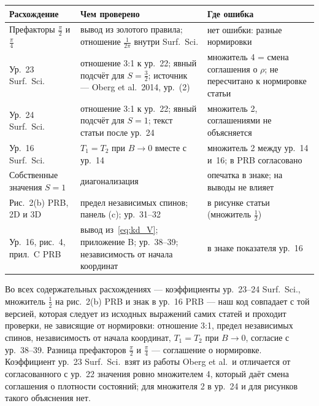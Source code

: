 \begin{center}\small
\begin{tabular}{p{3.6cm}p{5.6cm}p{4.8cm}}
\toprule
Расхождение & Чем проверено & Где ошибка \\
\midrule
Префакторы $\tfrac\pi2$ и $\tfrac\pi4$ & вывод из золотого правила; отношение
$\tfrac1{2\pi}$ внутри Surf.\ Sci. & нет ошибки: разные нормировки \\
Ур.~23 Surf.\ Sci. & отношение 3:1 к ур.~22; явный подсчёт для $S=\tfrac32$;
источник --- Oberg et al.\ 2014, ур.~(2) & множитель 4 = смена соглашения о $\rho$;
не пересчитано к нормировке статьи \\
Ур.~24 Surf.\ Sci. & отношение 3:1 к ур.~22; явный подсчёт для $S=1$; текст
статьи после ур.~24 & множитель 2, соглашениями не объясняется \\
Ур.~16 Surf.\ Sci. & $T_1=T_2$ при $B\to0$ вместе с ур.~14 & множитель 2 между
ур.~14 и~16; в PRB согласовано \\
Собственные значения $S=1$ & диагонализация & опечатка в знаке; на выводы не
влияет \\
Рис.~2(b) PRB, 2D и 3D & предел независимых спинов; панель (c);
ур.~31--32 & в рисунке статьи (множитель $\tfrac12$) \\
Ур.~16, рис.~4, прил.~C PRB & вывод из~\eqref{eq:kd_V}; приложение B;
ур.~38--39; независимость от начала координат & в знаке показателя ур.~16 \\
\bottomrule
\end{tabular}
\end{center}

\begin{cmpbox}[Итог]
Во всех содержательных расхождениях --- коэффициенты ур.~23--24 Surf.\ Sci.,
множитель $\tfrac12$ на рис.~2(b) PRB и знак в ур.~16 PRB --- наш код совпадает с той
версией, которая следует из исходных выражений самих статей и проходит
проверки, не зависящие от нормировки: отношение 3:1, предел независимых
спинов, независимость от начала координат, $T_1=T_2$ при $B\to0$, согласие с
ур.~38--39. Разница префакторов $\tfrac\pi2$ и $\tfrac\pi4$ --- соглашение о нормировке.
Коэффициент ур.~23 Surf.\ Sci.\ взят из работы Oberg et al.\ и отличается от
согласованного с ур.~22 значения ровно множителем 4, который даёт смена
соглашения о плотности состояний; для множителя 2 в ур.~24 и для рисунков
такого объяснения нет.
\end{cmpbox}

